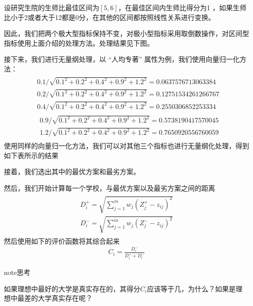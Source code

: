 \documentclass[letterpaper,10pt,english]{sphinxmanual}
\begin{document}
设研究生院的生师比最佳区间为\([5,6]\)，在最佳区间内生师比得分为1 ，如果生师比小于2或者大于12都是0分，在其他的区间都按照线性关系进行变换。

因此，我们把两个极大型指标保持不变，对极小型指标采用取倒数操作，对区间型指标使用上面介绍的处理方法。处理结果见下图。


接下来，我们进行无量纲处理，以 “人均专著” 属性为例，我们使用向量归一化方法：
\begin{equation*}
\begin{split}
\begin{aligned}
&0.1 / \sqrt{0.1^{2}+0.2^{2}+0.4^{2}+0.9^{2}+1.2^{2}}=0.0637576713063384\\
&0.2 / \sqrt{0.1^{2}+0.2^{2}+0.4^{2}+0.9^{2}+1.2^{2}}=0.12751534261266767\\
&0.4 / \sqrt{0.1^{2}+0.2^{2}+0.4^{2}+0.9^{2}+1.2^{2}}=0.2550306852253334\\
&\begin{array}{l}
{0.9 / \sqrt{0.1^{2}+0.2^{2}+0.4^{2}+0.9^{2}+1.2^{2}}=0.5738190417570045} \\
{1.2 / \sqrt{0.1^{2}+0.2^{2}+0.4^{2}+0.9^{2}+1.2^{2}}=0.7650920556760059}
\end{array}
\end{aligned}
\end{split}
\end{equation*}
使用同样的向量归一化方法，我们可以对其他三个指标也进行无量纲化处理，得到如下表所示的结果


接着，我们选出其中的最优方案和最劣方案。


然后，我们开始计算每一个学校，与最优方案以及最劣方案之间的距离
\begin{equation*}
\begin{split}
\begin{array}{l}
{D_{i}^{+}=\sqrt{\sum_{j=1}^{m} w_{j}\left(Z_{j}^{+}-z_{i j}\right)^{2}}} \\
{D_{i}^{-}=\sqrt{\sum_{j=1}^{m} w_{j}\left(Z_{j}^{-}-z_{i j}\right)^{2}}}
\end{array}
\end{split}
\end{equation*}
然后使用如下的评价函数将其综合起来
\begin{equation*}
\begin{split}
C_{i}=\frac{D_{i}^{-}}{D_{i}^{+}+D_{i}^{-}}
\end{split}
\end{equation*}
\begin{sphinxadmonition}{note}{思考}

如果理想中最好的大学是真实存在的，其得分\(C_i\)应该等于几，为什么？如果是理想中最差的大学真实存在呢？
\end{sphinxadmonition}
\end{document}
